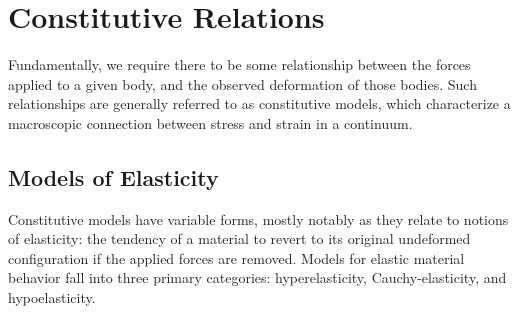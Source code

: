 \section{Constitutive Relations}

Fundamentally, we require there to be some relationship between the forces applied to a given body, and the observed deformation of those bodies. Such relationships are generally referred to as constitutive models, which characterize a macroscopic connection between stress and strain in a continuum.

\subsection{Models of Elasticity}

 Constitutive models have variable forms, mostly notably as they relate to notions of elasticity: the tendency of a material to revert to its original undeformed configuration if the applied forces are removed. Models for elastic material behavior fall into three primary categories: hyperelasticity, Cauchy-elasticity, and hypoelasticity.

